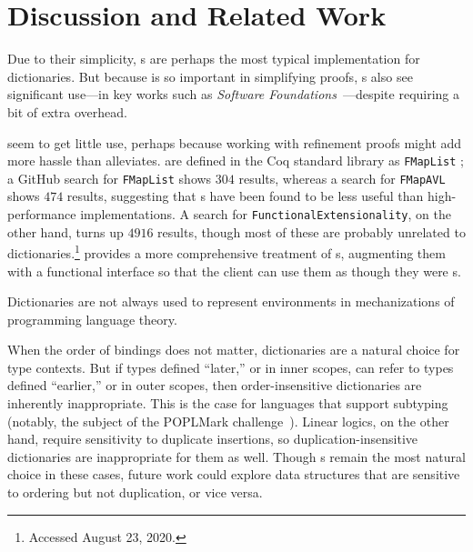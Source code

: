 \section{Discussion and Related Work}
\label{sec:Discussion}

\vspace{0.05in} %


%
Due to their simplicity, {\sal}s are perhaps the most typical implementation for dictionaries.
%
But because \SemInj{} is so important in simplifying proofs, {\FPF}s also see significant use---in key works such as \emph{Software Foundations}~\cite[Maps]{Pierce:SF1}---despite requiring a bit of extra overhead.


\Cals{} seem to get little use, perhaps because working with refinement proofs might add more hassle than \SemInj{} alleviates.
%
\Cals{} are defined in the Coq standard library as \texttt{FMapList} \citep{FMapList}; a GitHub search for \texttt{FMapList} shows $304$ results,
%
whereas a search for \texttt{FMapAVL} shows $474$ results, suggesting that {\cal}s have been found to be less useful than high-performance implementations.
%
A search for \texttt{FunctionalExtensionality}, on the other hand, turns up $4916$ results, though most of these are probably unrelated to dictionaries.\footnote{
%
%
Accessed August 23, 2020.
%
}
%
\citep{Amorim:fmap} provides a more comprehensive treatment of {\cal}s, augmenting them with a functional interface so that the client can
%
use them as though they were {\fpf}s.



Dictionaries are not always used to represent environments in mechanizations of programming language theory.

When the order of bindings does not matter, dictionaries are a natural choice for type contexts.
%
But if types defined ``later,'' or in inner scopes, can refer to types defined ``earlier,'' or in outer scopes, then order-insensitive dictionaries are inherently inappropriate.
%
This is the case for languages that support subtyping (notably, the subject of the POPLMark challenge~\citep{XXX}).
%
Linear logics, on the other hand, require sensitivity to duplicate insertions, so duplication-insensitive dictionaries are inappropriate for them as well.
%
Though {\sal}s remain the most natural choice in these cases, future work could explore data structures that are sensitive to ordering but not duplication, or vice versa.

